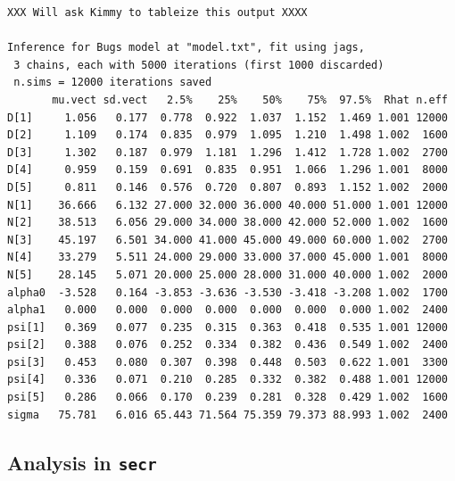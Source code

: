 {\small
\begin{verbatim}
XXX Will ask Kimmy to tableize this output XXXX

Inference for Bugs model at "model.txt", fit using jags,
 3 chains, each with 5000 iterations (first 1000 discarded)
 n.sims = 12000 iterations saved
       mu.vect sd.vect   2.5%    25%    50%    75%  97.5%  Rhat n.eff
D[1]     1.056   0.177  0.778  0.922  1.037  1.152  1.469 1.001 12000
D[2]     1.109   0.174  0.835  0.979  1.095  1.210  1.498 1.002  1600
D[3]     1.302   0.187  0.979  1.181  1.296  1.412  1.728 1.002  2700
D[4]     0.959   0.159  0.691  0.835  0.951  1.066  1.296 1.001  8000
D[5]     0.811   0.146  0.576  0.720  0.807  0.893  1.152 1.002  2000
N[1]    36.666   6.132 27.000 32.000 36.000 40.000 51.000 1.001 12000
N[2]    38.513   6.056 29.000 34.000 38.000 42.000 52.000 1.002  1600
N[3]    45.197   6.501 34.000 41.000 45.000 49.000 60.000 1.002  2700
N[4]    33.279   5.511 24.000 29.000 33.000 37.000 45.000 1.001  8000
N[5]    28.145   5.071 20.000 25.000 28.000 31.000 40.000 1.002  2000
alpha0  -3.528   0.164 -3.853 -3.636 -3.530 -3.418 -3.208 1.002  1700
alpha1   0.000   0.000  0.000  0.000  0.000  0.000  0.000 1.002  2400
psi[1]   0.369   0.077  0.235  0.315  0.363  0.418  0.535 1.001 12000
psi[2]   0.388   0.076  0.252  0.334  0.382  0.436  0.549 1.002  2400
psi[3]   0.453   0.080  0.307  0.398  0.448  0.503  0.622 1.001  3300
psi[4]   0.336   0.071  0.210  0.285  0.332  0.382  0.488 1.001 12000
psi[5]   0.286   0.066  0.170  0.239  0.281  0.328  0.429 1.002  1600
sigma   75.781   6.016 65.443 71.564 75.359 79.373 88.993 1.002  2400
\end{verbatim}
}


\subsection{Analysis in \mbox{\tt secr} }


